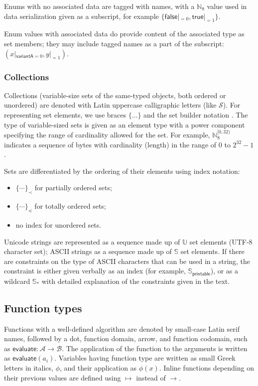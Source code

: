 \documentclass[9pt,oneside]{amsart}
\begin{document}
\begin{multicols}{2}
Enums with no associated data are tagged with names,
with a $\mathbb{N}_8$ value used in data serialization given as a subscript,
for example $\{ \mathsf{false}|_{=0}, \mathsf{true}|_{=1} \}$.

Enum values with associated data do provide content of the associated type as set members;
they may include tagged names as a part of the subscript: $( x|_{\mathsf{variantA}=0}, y|_{=1})$.

\subsubsection{Collections}

Collections (variable-size sets of the same-typed objects, both ordered or unordered)
are denoted with Latin uppercase calligraphic letters (like $\mathcal{S}$).
For representing set elements, we use braces $\{\ldots\}$ and the set builder notation \cite{setbuilder}.
The type of variable-sized sets is given as an element type with a power component
specifying the range of cardinality allowed for the set.
For example, $\mathbb{N}_8^{[0, 32)}$ indicates a sequence of bytes with cardinality (length)
in the range of $0$ to $2^{32} - 1$.

Sets are differentiated by the ordering of their elements using index notation:
\begin{itemize}
    \item $\{ \cdots \}_\prec$ for partially ordered sets;
    \item $\{ \cdots \}_\preceq$ for totally ordered sets;
    \item no index for unordered sets.
\end{itemize}

Unicode strings are represented as a sequence made up of $\mathbb{U}$ set elements
(UTF-8 character set); ASCII strings as a sequence made up of $\mathbb{S}$ set elements.
If there are constraints on the type of ASCII characters that can be used in a string,
the constraint is either given verbally as an index (for example, $\mathbb{S}_\mathsf{printable}$),
or as a wildcard $\mathbb{S}_*$ with detailed explanation of the constraints given in the text.

\subsection{Function types}

Functions with a well-defined algorithm are denoted by small-case Latin serif names,
followed by a dot, function domain, arrow, and function codomain,
such as $\mathsf{evaluate}: \mathcal{A} \rightarrow \mathcal{B}$.
The application of the function to the arguments is written as $\mathsf{evaluate}(a_i)$.
Variables having function type are written as small Greek letters in italics, $\phi$,
and their application as $\phi(x)$.
Inline functions depending on their previous values are defined using
$\mapsto$ instead of $\rightarrow$.


\end{multicols}
\end{document}
